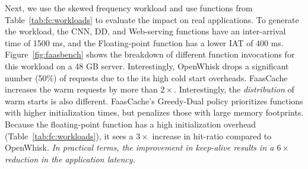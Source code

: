 Next, we use the skewed frequency workload and use functions from Table~\ref{tab:fc:workloads} to evaluate the impact on real applications. 
To generate the workload, the CNN, DD, and Web-serving functions have an inter-arrival time of 1500 ms, and the Floating-point function has a lower IAT of 400 ms. 
%
Figure~\ref{fig:faasbench} shows the breakdown of different function invocations for this workload on a 48 GB server.
Interestingly, OpenWhisk drops a significant number (50\%) of requests due to the its high cold start overheads.
FaasCache increases the warm requests by more than $2\times$. 
Interestingly, the \emph{distribution} of warm starts is also different. 
FaasCache's Greedy-Dual policy prioritizes functions with higher initialization times, but penalizes those with large memory footprints. 
Because the floating-point function has a high initialization overhead (Table~\ref{tab:fc:workloads}), it sees a $3\times$ increase in hit-ratio compared to OpenWhisk.
\emph{In practical terms, the improvement in keep-alive results in a $6\times$ reduction in the application latency.
}

